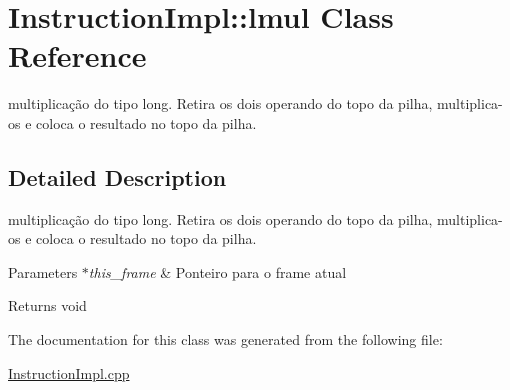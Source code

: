 \hypertarget{class_instruction_impl_1_1lmul}{}\section{Instruction\+Impl\+:\+:lmul Class Reference}
\label{class_instruction_impl_1_1lmul}


multiplicação do tipo long. Retira os dois operando do topo da pilha, multiplica-\/os e coloca o resultado no topo da pilha.  




\subsection{Detailed Description}
multiplicação do tipo long. Retira os dois operando do topo da pilha, multiplica-\/os e coloca o resultado no topo da pilha. 


\begin{DoxyParams}{Parameters}
{\em $\ast$this\+\_\+frame} & Ponteiro para o frame atual \\
\hline
\end{DoxyParams}
\begin{DoxyReturn}{Returns}
void 
\end{DoxyReturn}


The documentation for this class was generated from the following file\+:\begin{DoxyCompactItemize}
\item 
\hyperlink{_instruction_impl_8cpp}{Instruction\+Impl.\+cpp}\end{DoxyCompactItemize}
